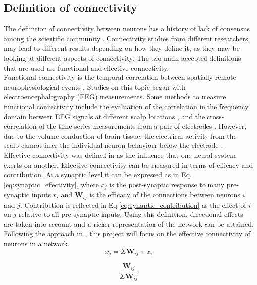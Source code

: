 \documentclass[10pt]{article}
\begin{document}
\subsection{Definition of connectivity}

The definition of connectivity between neurons has a history of lack of consensus among the scientific community \cite{HORWITZ2003466}. Connectivity studies from different researchers may lead to different results depending on how they define it, as they may be looking at different aspects of connectivity. The two main accepted definitions that are used are functional and effective connectivity.
\\
Functional connectivity is the temporal correlation between spatially remote neurophysiological events \cite{friston1993functional}. Studies on this topic began with electroencephalography (EEG) measurements. Some methods to measure functional connectivity include the evaluation of the correlation in the frequency domain between EEG signals at different scalp locations \cite{pfurtscheller1999event}, and the cross-correlation of the time series measurements from a pair of electrodes \cite{gevins1985neurocognitive}. However, due to the volume conduction of brain tissue, the electrical activity from the scalp cannot infer the individual neuron behaviour below the electrode \cite{HORWITZ2003466}.
\\
Effective connectivity was defined in \cite{friston1993functional} as the influence that one neural system exerts on another. Effective connectivity can be measured in terms of efficacy and contribution. At a synaptic level it can be expressed as in Eq.\ref{eq:synaptic_effectivity}, where $x_{j}$ is the post-synaptic response to many pre-synaptic inputs $x_{i}$ and $\textbf{W}_{ij}$ is the efficacy of the connections between neurons $i$ and $j$. Contribution is reflected in Eq.\ref{eq:synaptic_contribution} as the effect of $i$ on $j$ relative to all pre-synaptic inputs. Using this definition, directional effects are taken into account and a richer representation of the network can be attained. Following the approach in \cite{alexandru2018estimating}, this project will focus on the effective connectivity of neurons in a network.
\\

\begin{equation}\label{eq:synaptic_effectivity}
x_{j} = \Sigma \textbf{W}_{ij}\times x_{i}
\end{equation}

\begin{equation}\label{eq:synaptic_contribution}
\frac{\textbf{W}_{ij}}{\Sigma \textbf{W}_{ij}}
\end{equation}
\end{document}
